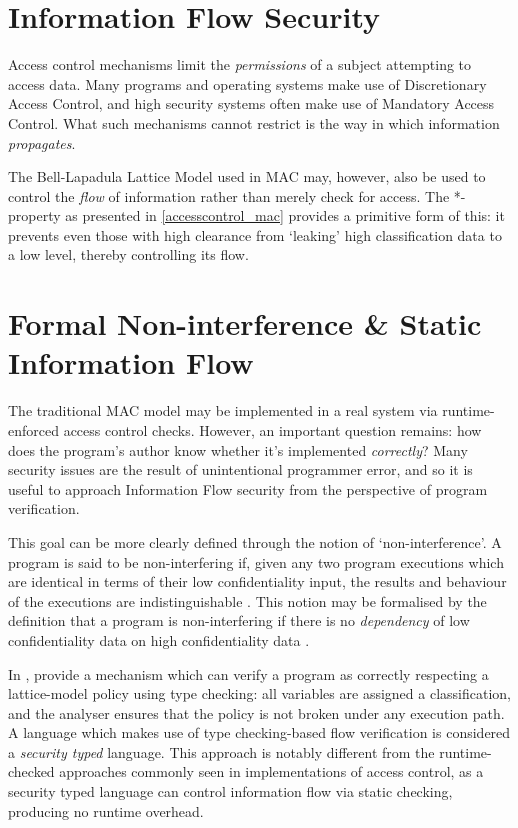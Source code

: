 \section{Information Flow Security}

Access control mechanisms limit the \textit{permissions} of a subject attempting to access data. Many programs and operating systems make use of Discretionary Access Control, and high security systems often make use of Mandatory Access Control. What such mechanisms cannot restrict is the way in which information \textit{propagates}.

The Bell-Lapadula Lattice Model used in MAC may, however, also be used to control the \textit{flow} of information rather than merely check for access. The *-property as presented in \ref{accesscontrol_mac} provides a primitive form of this: it prevents even those with high clearance from `leaking' high classification data to a low level, thereby controlling its flow.

\section{Formal Non-interference \& Static Information Flow} \label{theory_if_noninterference}

The traditional MAC model may be implemented in a real system via runtime-enforced access control checks. However, an important question remains: how does the program's author know whether it's implemented \textit{correctly}? Many security issues are the result of unintentional programmer error, and so it is useful to approach Information Flow security from the perspective of program verification.

This goal can be more clearly defined through the notion of `non-interference'. A program is said to be non-interfering if, given any two program executions which are identical in terms of their low confidentiality input, the results and behaviour of the executions are indistinguishable \cite{sabelfeld2003if}. This notion may be formalised by the definition that a program is non-interfering if there is no \textit{dependency} of low confidentiality data on high confidentiality data \cite{cohen1977declassification}.

In , \citeauthor{denning1977certification} \cite{denning1977certification} provide a mechanism which can verify a program as correctly respecting a lattice-model policy using type checking: all variables are assigned a classification, and the analyser ensures that the policy is not broken under any execution path. A language which makes use of type checking-based flow verification is considered a \textit{security typed} language. This approach is notably different from the runtime-checked approaches commonly seen in implementations of access control, as a security typed language can control information flow via static checking, producing no runtime overhead.

